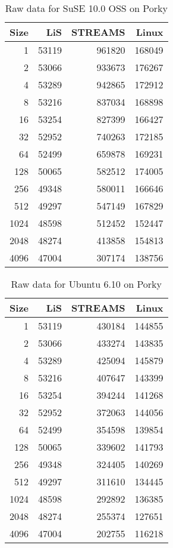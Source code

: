 \documentclass[letterpaper,final,notitlepage,twocolumn,10pt,twoside]{article}
\begin{document}
\begin{appendix}
\begin{table}[h]
\footnotesize
\setlength{\tabcolsep}{0.3em}
\setlength{\arraycolsep}{0.3em}
\begin{center}
\begin{tabular}{rrrr}\\
\hline
Size & LiS & STREAMS & Linux\\
\hline
\hline
1 & 53119 & 961820 & 168049\\
2 & 53066 & 933673 & 176267\\
4 & 53289 & 942865 & 172912\\
8 & 53216 & 837034 & 168898\\
16 & 53254 & 827399 & 166427\\
32 & 52952 & 740263 & 172185\\
64 & 52499 & 659878 & 169231\\
128 & 50065 & 582512 & 174005\\
256 & 49348 & 580011 & 166646\\
512 & 49297 & 547149 & 167829\\
1024 & 48598 & 512452 & 152447\\
2048 & 48274 & 413858 & 154813\\
4096 & 47004 & 307174 & 138756\\
\hline
\end{tabular}
\end{center}
\caption{Raw data for SuSE 10.0 OSS on Porky}
\label{table:susedata}
\normalsize
\end{table}

\begin{table}[hp]
\footnotesize
\setlength{\tabcolsep}{0.3em}
\setlength{\arraycolsep}{0.3em}
\begin{center}
\begin{tabular}{rrrr}\\
\hline
Size & LiS & STREAMS & Linux\\
\hline
\hline
1 & 53119 & 430184 & 144855\\
2 & 53066 & 433274 & 143835\\
4 & 53289 & 425094 & 145879\\
8 & 53216 & 407647 & 143399\\
16 & 53254 & 394244 & 141268\\
32 & 52952 & 372063 & 144056\\
64 & 52499 & 354598 & 139854\\
128 & 50065 & 339602 & 141793\\
256 & 49348 & 324405 & 140269\\
512 & 49297 & 311610 & 134445\\
1024 & 48598 & 292892 & 136385\\
2048 & 48274 & 255374 & 127651\\
4096 & 47004 & 202755 & 116218\\
\hline
\end{tabular}
\end{center}
\caption{Raw data for Ubuntu 6.10 on Porky}
\label{table:ubuntudata}
\normalsize
\end{table}


\end{appendix}
\end{document}
